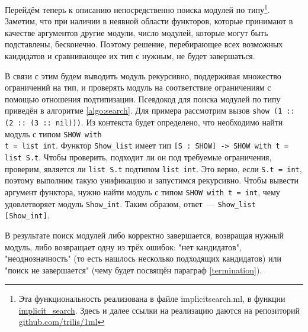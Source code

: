\documentclass[../diploma.tex]{subfiles}
\begin{document}
Перейдём теперь к описанию непосредственно поиска модулей по типу\footnote{Эта функциональность реализована в файле implicitsearch.ml, в функции \href{https://github.com/trilis/1ml/blob/5b850e875e9ae06d3ce8e90a22cedbabcf0f33ca/implicitsearch.ml\#L102}{implicit\_search}. Здесь и далее ссылки на реализацию даются на репозиторий \href{https://github.com/trilis/1ml}{github.com/trilis/1ml}}. Заметим, что при наличии в неявной области функторов, которые принимают в качестве аргументов другие модули, число модулей, которые могут быть подставлены, бесконечно. Поэтому решение, перебирающее всех возможных кандидатов и сравнивающее их тип с нужным, не будет завершаться.

В связи с этим будем выводить модуль рекурсивно, поддерживая множество ограничений на тип, и проверять модуль на соответствие ограничениям с помощью отношения подтипизации. Псевдокод для поиска модулей по типу приведён в алгоритме \ref{algo:search}. Для примера рассмотрим вызов \texttt{show (1 :: (2 :: (3 :: nil)))}. Из контекста будет определено, что необходимо найти модуль с типом \texttt{SHOW with}\\\texttt{t = list int}. Функтор \texttt{Show_list} имеет тип \texttt{[S : SHOW] -> SHOW with t = list S.t}. Чтобы проверить, подходит ли он под требуемые ограничения, проверим, является ли \texttt{list S.t} подтипом \texttt{list int}. Это верно, если \texttt{S.t = int}, поэтому выполним такую унификацию и запустимся рекурсивно. Чтобы вывести аргумент функтора, нужно найти модуль с типом \texttt{SHOW with t = int}, чему удовлетворяет модуль \texttt{Show_int}. Таким образом, ответ~--- \texttt{Show_list [Show_int]}.

В результате поиск модулей либо корректно завершается, возвращая нужный модуль, либо возвращает одну из трёх ошибок: "нет кандидатов", "неоднозначность" (то есть нашлось несколько подходящих кандидатов) или "поиск не завершается" (чему будет посвящён параграф \ref{termination}).
\end{document}
